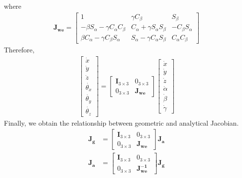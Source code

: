 where
\begin{equation*}
\label{eq:jacobian_euler}
\begin{split}
\mathbf{J_{we}}
=
\begin{bmatrix}
1														& \gamma C_{\beta}							& S_{\beta}\\
- \beta S_{\alpha} -  \gamma C_{\alpha}C_{\beta}		& C_{\alpha} +  \gamma S_{\alpha}S_{\beta}	& -C_{\beta}S_{\alpha}\\
\beta C_{\alpha} -  \gamma C_{\beta}S_{\alpha}			& S_{\alpha} -  \gamma C_{\alpha}S_{\beta}	&  C_{\alpha}C_{\beta}
\end{bmatrix}
\end{split}
\end{equation*}
Therefore,
\begin{equation}
\begin{split}
\begin{bmatrix}
\dot{x} \\
\dot{y} \\
\dot{z} \\
\dot{\theta _x} \\
\dot{\theta _y} \\
\dot{\theta _z} 
\end{bmatrix}
=
\begin{bmatrix}
\mathbf{I}_{3\times 3} & 0_{3\times 3}\\
0_{3\times 3} & \mathbf{J_{we}}
\end{bmatrix}
\begin{bmatrix}
\dot{x} \\
\dot{y} \\
\dot{z} \\
\dot{\alpha} \\ 
\dot{\beta} \\ 
\dot{\gamma} 
\end{bmatrix}
\end{split}
\end{equation}
Finally, we obtain the relationship between geometric and analytical Jacobian.
\begin{equation}
\begin{split}
\mathbf{J_g} &= 
\begin{bmatrix}
\mathbf{I}_{3\times 3} & 0_{3\times 3}\\
0_{3\times 3} & \mathbf{J_{we}}
\end{bmatrix}
\mathbf{J_a}
\\
\mathbf{J_a} &= 
\begin{bmatrix}
\mathbf{I}_{3\times 3} & 0_{3\times 3}\\
0_{3\times 3} & \mathbf{J_{we}^{-1}}
\end{bmatrix}
\mathbf{J_g}
\end{split}
\end{equation}

